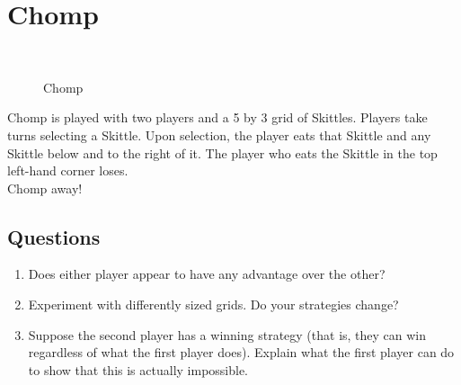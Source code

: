 \documentclass[12pt]{article}
\begin{document}
\section*{Chomp}
\begin{figure}[h]
	\centering
    \\
    \caption{Chomp}
\end{figure}
Chomp is played with two players and a 5 by 3 grid of Skittles. Players take turns selecting a Skittle. Upon selection, the player eats that Skittle and any Skittle below and to the right of it. The player who eats the Skittle in the top left-hand corner loses.\\

\noindent Chomp away!

\subsection*{Questions}
\begin{enumerate}
	\item Does either player appear to have any advantage over the other?
	\vspace{1.5cm}
	\item Experiment with differently sized grids. Do your strategies change?
	\vspace{1.5cm}
	\item Suppose the second player has a winning strategy (that is, they can win regardless of what the first player does). Explain what the first player can do to show that this is actually impossible.
\end{enumerate}
\end{document}
